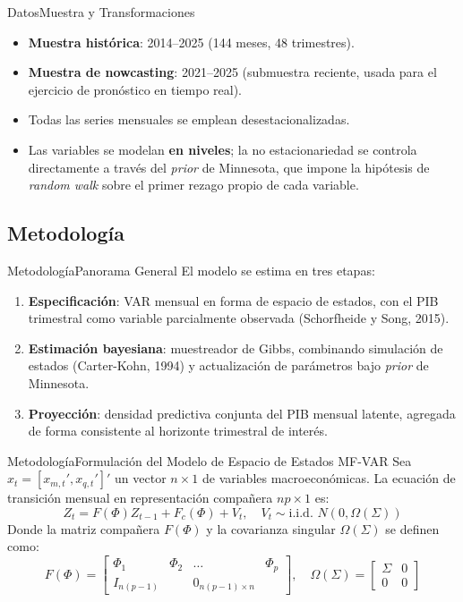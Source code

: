\documentclass{beamer}
\begin{document}
\begin{frame}{Datos}{Muestra y Transformaciones}\justifying
\begin{itemize}\justifying
    \item \textbf{Muestra histórica}: 2014--2025 (144 meses, 48 trimestres).
    \item \textbf{Muestra de nowcasting}: 2021--2025 (submuestra reciente, usada para el ejercicio de pronóstico en tiempo real).
    \item Todas las series mensuales se emplean desestacionalizadas.
    \item Las variables se modelan \textbf{en niveles}; la no estacionariedad se controla directamente a través del \textit{prior} de Minnesota, que impone la hipótesis de \textit{random walk} sobre el primer rezago propio de cada variable.
\end{itemize}
\end{frame}


\subsection{Metodología}

\begin{frame}{Metodología}{Panorama General}\justifying
El modelo se estima en tres etapas: \pause
\begin{enumerate}\justifying
    \item \textbf{Especificación}: VAR mensual en forma de espacio de estados, con el PIB trimestral como variable parcialmente observada (Schorfheide y Song, 2015). \pause
    \item \textbf{Estimación bayesiana}: muestreador de Gibbs, combinando simulación de estados (Carter-Kohn, 1994) y actualización de parámetros bajo \textit{prior} de Minnesota. \pause
    \item \textbf{Proyección}: densidad predictiva conjunta del PIB mensual latente, agregada de forma consistente al horizonte trimestral de interés.
\end{enumerate}
\end{frame}

\begin{frame}{Metodología}{Formulación del Modelo de Espacio de Estados MF-VAR}\justifying
Sea $x_t = [x_{m,t}', x_{q,t}']'$ un vector $n \times 1$ de variables macroeconómicas. La ecuación de transición mensual en representación compañera $np \times 1$ es: \pause
\[
Z_t = F(\Phi) Z_{t-1} + F_c(\Phi) + V_t, \quad V_t \sim \text{i.i.d. } N(0, \Omega(\Sigma))
\] \pause
Donde la matriz compañera $F(\Phi)$ y la covarianza singular $\Omega(\Sigma)$ se definen como: \pause
\[
F(\Phi) = \begin{bmatrix} \Phi_1 & \Phi_2 & \dots & \Phi_p \\ I_{n(p-1)} & & 0_{n(p-1) \times n} \end{bmatrix}, \quad \Omega(\Sigma) = \begin{bmatrix} \Sigma & 0 \\ 0 & 0 \end{bmatrix}
\]
\end{frame}
\end{document}
